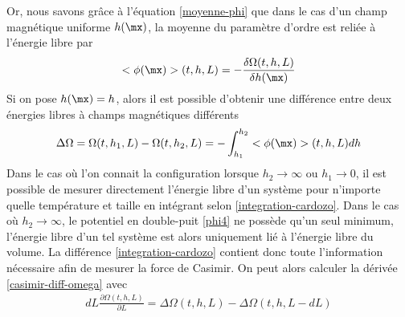 Or, nous savons grâce à l'équation \ref{moyenne-phi} que dans le cas d'un champ magnétique uniforme $h(\mx)$, la moyenne du paramètre d'ordre est reliée à l'énergie libre par
\begin{align}
    <\phi(\mx)>(t,h,L) = - \frac{\delta \Omega(t,h,L)}{\delta h(\mx)}
\end{align} 
Si on pose $h(\mx) = h$, alors il est possible d'obtenir une différence entre deux énergies libres à champs magnétiques différents \cite{lopes_cardozo_critical_2014} 
\begin{align}
    \Delta \Omega = \Omega(t,h_1,L) - \Omega(t,h_2,L) = - \int_{h_1}^{h_2} <\phi(\mx)>(t,h,L) dh
    \label{integration-cardozo}
\end{align}
Dans le cas où l'on connait la configuration lorsque $h_2 \to \infty$ ou $h_1 \to 0$, il est possible de mesurer directement l'énergie libre d'un système pour n'importe quelle température et taille en intégrant selon \ref{integration-cardozo}. Dans le cas où $h_2 \to \infty$, le potentiel en double-puit \ref{phi4} ne possède qu'un seul minimum, l'énergie libre d'un tel système est alors uniquement lié à l'énergie libre du volume.
La différence \ref{integration-cardozo} contient donc toute l'information nécessaire afin de mesurer la force de Casimir. On peut alors calculer la dérivée \ref{casimir-diff-omega} avec
\begin{align}
    dL \frac{\partial \Omega(t,h,L)}{\partial L} = \Delta \Omega(t,h,L)-\Delta \Omega(t,h,L-dL)
\end{align}

